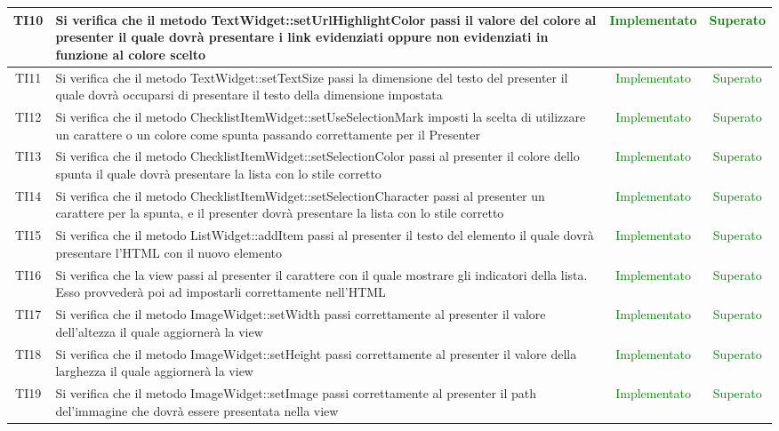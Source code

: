 \begin{center}
\begin{longtable}{|c|>{\centering}m{10cm}|c|c|}
		TI10 & Si verifica che il metodo TextWidget::setUrlHighlightColor passi il valore del colore al presenter il quale dovrà presentare i link evidenziati oppure non evidenziati in funzione al colore scelto & \textcolor{Green}{Implementato} & \textcolor{Green}{Superato} \\ \hline
		TI11 & Si verifica che il metodo TextWidget::setTextSize passi la dimensione del testo del presenter il quale dovrà occuparsi di presentare il testo della dimensione impostata & \textcolor{Green}{Implementato} & \textcolor{Green}{Superato} \\ \hline
		TI12 & Si verifica che il metodo ChecklistItemWidget::setUseSelectionMark imposti la scelta di utilizzare un carattere o un colore come spunta passando correttamente per il Presenter & \textcolor{Green}{Implementato} & \textcolor{Green}{Superato} \\ \hline
		TI13 & Si verifica che il metodo ChecklistItemWidget::setSelectionColor passi al presenter il colore dello spunta il quale dovrà presentare la lista con lo stile corretto & \textcolor{Green}{Implementato} & \textcolor{Green}{Superato} \\ \hline
		TI14 & Si verifica che il metodo ChecklistItemWidget::setSelectionCharacter passi al presenter un carattere per la spunta, e il presenter dovrà presentare la lista con lo stile corretto & \textcolor{Green}{Implementato} & \textcolor{Green}{Superato} \\ \hline
		TI15 & Si verifica che il metodo ListWidget::addItem passi al presenter il testo del elemento il quale dovrà presentare l'HTML con il nuovo elemento & \textcolor{Green}{Implementato} & \textcolor{Green}{Superato} \\ \hline
		TI16 & Si verifica che la view passi al presenter il carattere con il quale mostrare gli indicatori della lista. Esso provvederà poi ad impostarli correttamente nell'HTML & \textcolor{Green}{Implementato} & \textcolor{Green}{Superato} \\ \hline
		TI17 & Si verifica che il metodo ImageWidget::setWidth passi correttamente al presenter il valore dell'altezza il quale aggiornerà la view & \textcolor{Green}{Implementato} & \textcolor{Green}{Superato} \\ \hline
		TI18 & Si verifica che il metodo ImageWidget::setHeight passi correttamente al presenter il valore della larghezza il quale aggiornerà la view & \textcolor{Green}{Implementato} & \textcolor{Green}{Superato} \\ \hline
		TI19 & Si verifica che il metodo ImageWidget::setImage passi correttamente al presenter il path del'immagine che dovrà essere presentata nella view & \textcolor{Green}{Implementato} & \textcolor{Green}{Superato} \\ \hline

\end{longtable}
\end{center}
